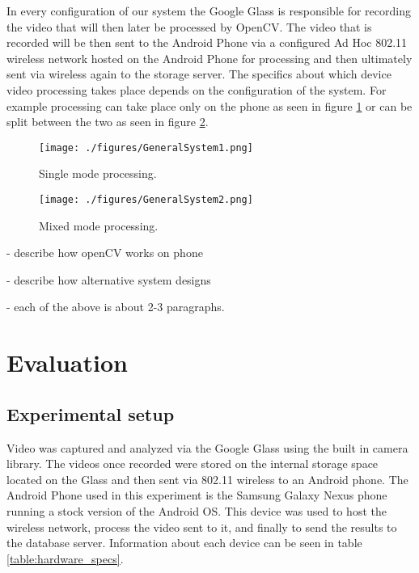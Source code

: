 \documentclass[conference]{IEEEtran}
\begin{document}
In every configuration of our system the Google Glass is responsible for recording the video that will then later be processed by OpenCV. The video that is recorded will be then sent to the Android Phone via a configured Ad Hoc 802.11 wireless network hosted on the Android Phone for processing and then ultimately sent via wireless again to the storage server. The specifics about which device video processing takes place depends on the configuration of the system. For example processing can take place only on the phone as seen in figure \ref{fig:generalsystem1} or can be split between the two as seen in figure \ref{fig:generalsystem2}.

\begin{figure}[H]
\centering
\texttt{[image: ./figures/GeneralSystem1.png]}
\caption{Single mode processing.}
\label{fig:generalsystem1}
\end{figure}

\begin{figure}[H]
\centering
\texttt{[image: ./figures/GeneralSystem2.png]}
\caption{Mixed mode processing.}
\label{fig:generalsystem2}
\end{figure}

 

- describe how openCV works on phone

- describe how alternative system designs 

- each of the above is about 2-3 paragraphs. 

\section{Evaluation}

\subsection{Experimental setup}
Video was captured and analyzed via the Google Glass using the built in camera library. The videos once recorded were stored on the internal storage space located on the Glass and then sent via 802.11 wireless to an Android phone. The Android Phone used in this experiment is the Samsung Galaxy Nexus phone running a stock version of the Android OS. This device was used to host the wireless network, process the video sent to it, and finally to send the results to the database server. Information about each device can be seen in table \ref{table:hardware_specs}.
\end{document}

